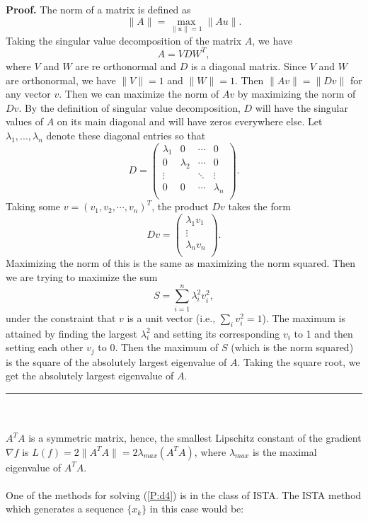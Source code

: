\documentclass[12pt]{article}
\newenvironment{proof}[1][Proof]{\textbf{#1.} }{\ \rule{0.5em}{0.5em}}
\begin{document}
\begin{proof}
The norm of a matrix is defined as 
$$\|A\| = \max_{\|u\| =1} \|Au\|.$$
Taking the singular value decomposition of the matrix $A$, we have
$$A=VDW^T,$$
where $V$ and $W$ are re orthonormal and $D$ is a diagonal matrix. Since $V$ and $W$ are orthonormal, we have $\|V\|=1$ and $\|W\|=1$. Then $\|Av\|=\|Dv\|$ for any vector $v$. Then we can maximize the norm of $Av$ by maximizing the norm of $Dv$.
By the definition of singular value decomposition, $D$ will have the singular values of $A$ on its main diagonal and will have zeros everywhere else. Let $\lambda_1,...,\lambda_n$ denote these diagonal entries so that
$$D= 
\begin{pmatrix} 
\lambda_1 & 0 & \cdots & 0 \\
0 & \lambda_2 & \cdots & 0 \\
\vdots & & \ddots & \vdots\\
0 & 0 & \cdots & \lambda_n \\
\end{pmatrix}.
$$
Taking some $v=(v_1,v_2,\cdots,v_n)^T$, the product $Dv$ takes the form
$$Dv= 
\begin{pmatrix} 
\lambda_1 v_1 \\
\vdots \\
\lambda_n v_n\\
\end{pmatrix}
.$$
Maximizing the norm of this is the same as maximizing the norm squared. Then we are trying to maximize the sum
$$S= \sum_{i=1}^{n} \lambda_i^2 v_i^2, $$
under the constraint that $v$ is a unit vector (i.e., $\sum_i v_i^2=1$). The maximum is attained by finding the largest $\lambda_i^2$ and setting its corresponding $v_i$ to 1 and then setting each other $v_j$ to 0. Then the maximum of $S$ (which is the norm squared) is the square of the absolutely largest eigenvalue of $A$. Taking the square root, we get the absolutely largest eigenvalue of $A$.
\end{proof}\\
\\$A^TA$ is a symmetric matrix, hence, the smallest Lipschitz constant of the gradient $ \nabla f$ is  $L(f) = 2\|A^TA\| = 2 \lambda_{max}(A^TA)$, where $\lambda_{max}$ is the maximal eigenvalue of $A^TA$.\\
\\One of the methods for solving (\ref{P:d4}) is in the class of ISTA.
The ISTA method which generates a sequence $\{x_k\}$ in this case would be:
\end{document}
